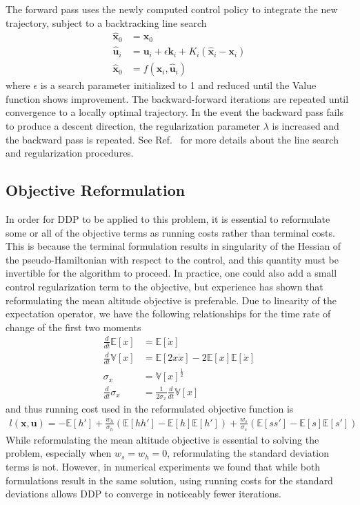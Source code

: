 \documentclass[journal ]{new-aiaa}
\newcommand{\state}{\ensuremath{\mathbf{x}}}
\newcommand{\control}{\ensuremath{\mathbf{u}}}
\newcommand{\E}[1]{\mathbb{E}\left[#1\right]}
\newcommand{\V}[1]{\mathbb{V}[#1]}
\begin{document}
The forward pass uses the newly computed control policy to integrate the new trajectory, subject to a backtracking line search
\begin{align}
\hat{\state}_0 &= \state_0 \\
\hat{\control}_{i} &= \control_i + \epsilon \mathbf{k}_i + K_i(\hat{\state}_i - \state_i)\\
\hat{\state}_0 &= f(\hat{\state}_i,\hat{\control}_i)
\end{align}
where $\epsilon$ is a search parameter initialized to 1 and reduced until the Value function shows improvement. The backward-forward iterations are repeated until convergence to a locally optimal trajectory. In the event the backward pass fails to produce a descent direction, the regularization parameter $\lambda$ is increased and the backward pass is repeated. See Ref.~\cite{DDP_ControlLimited} for more details about the line search and regularization procedures. 
%
\subsection*{Objective Reformulation}
In order for DDP to be applied to this problem, it is essential to reformulate some or all of the objective terms as running costs rather than terminal costs. This is because the terminal formulation results in singularity of the Hessian of the pseudo-Hamiltonian with respect to the control, and this quantity must be invertible for the algorithm to proceed. In practice, one could also add a small control regularization term to the objective, but experience has shown that reformulating the mean altitude objective is preferable. Due to linearity of the expectation operator, we have the following relationships for the time rate of change of the first two moments
\begin{align}
\frac{d }{d t}\E{x} &= \E{\dot{x}} \\
\frac{d }{d t}\V{x} &= \E{2x\dot{x}} - 2\E{x}\E{\dot{x}} \\
\sigma_x &= \V{x}^{\frac{1}{2}} \\
\frac{d }{d t}\sigma_x &= \frac{1}{2\sigma_x}\frac{d }{d t}\V{x}
\end{align}
and thus running cost used in the reformulated objective function is 
\begin{align}
l(\state,\control) = -\E{h'} +  \frac{w_h}{\sigma_h}(\E{hh'}-\E{h}\E{h'}) + \frac{w_s}{\sigma_s}(\E{ss'}-\E{s}\E{s'})
\end{align}
While reformulating the mean altitude objective is essential to solving the problem, especially when $w_s=w_h=0$, reformulating the standard deviation terms is not. However, in numerical experiments we found that while both formulations result in the same solution, using running costs for the standard deviations allows DDP to converge in noticeably fewer iterations.
\end{document}
